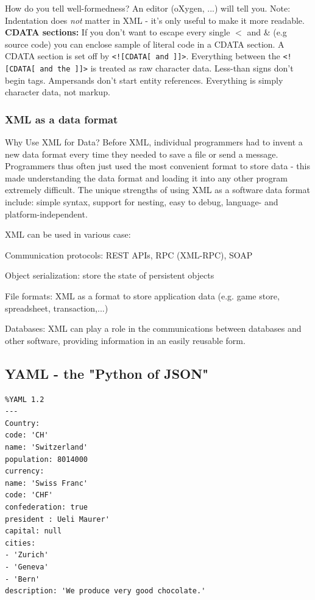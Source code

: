\documentclass[11pt,oneside,a4paper]{article}
\begin{document}
How do you tell well-formedness? An editor (oXygen, ...) will tell you. Note: Indentation does \textit{not} matter in XML - it's only useful to make it more readable.\\

\textbf{CDATA sections:} If you don't want to escape every single $<$ and \& (e.g source code) you can enclose sample of literal code in a CDATA section. A CDATA section is set off by \verb|<![CDATA[ and ]]>|. Everything between the \verb|<![CDATA[ and the ]]>| is treated as raw character data. Less-than signs don’t begin tags. Ampersands don’t start entity references. Everything is simply character data, not markup.

\newpage

\subsubsection{XML as a data format}

Why Use XML for Data? Before XML, individual programmers had to invent a new data format every time they needed to save a file or send a message. Programmers thus often just used the most convenient format to store data - this made understanding the data format and loading it into any other program extremely difficult. The unique strengths of using XML as a software data format include: simple syntax, support for nesting, easy to debug, language- and platform-independent.

XML can be used in various case:

\begin{compactitem}
	\item Communication protocols: REST APIs, RPC (XML-RPC), SOAP
	\item Object serialization: store the state of persistent objects
	\item File formats: XML as a format to store application data (e.g. game store, spreadsheet, transaction,...)
	\item Databases: XML can play a role in the communications between databases and other software, providing information in an easily reusable form. 
\end{compactitem}

\subsection{YAML - the "Python of JSON"}

\begin{verbatim}
%YAML 1.2
---
Country:
code: 'CH'
name: 'Switzerland'
population: 8014000
currency:
name: 'Swiss Franc'
code: 'CHF'
confederation: true
president : Ueli Maurer'
capital: null
cities:
- 'Zurich'
- 'Geneva'
- 'Bern'
description: 'We produce very good chocolate.'
\end{verbatim}
\end{document}
